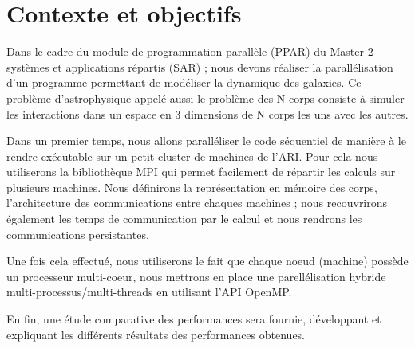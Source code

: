 \section{Contexte et objectifs}
\par Dans le cadre du module de programmation parallèle (PPAR)
du Master 2 systèmes et applications répartis (SAR) ; nous devons réaliser
la parallélisation d'un programme permettant de modéliser la dynamique des galaxies.
Ce problème d'astrophysique appelé aussi le problème des N-corps consiste à 
simuler les interactions dans un espace en 3 dimensions de N corps les uns avec
les autres.\\
\par Dans un premier temps, nous allons paralléliser le code séquentiel de manière 
à le rendre exécutable sur un petit cluster de machines de l'ARI. Pour cela nous 
utiliserons la bibliothèque MPI qui permet facilement de répartir les calculs sur 
plusieurs machines. Nous définirons la représentation en mémoire des corps, l'architecture des
communications entre chaques machines ; nous recouvrirons également les temps de 
communication par le calcul et nous rendrons les communications persistantes.\\
\par Une fois cela effectué, nous utiliserons le fait que chaque noeud (machine)
possède un processeur multi-coeur, nous mettrons en place une parellélisation hybride
multi-processus/multi-threads en utilisant l'API OpenMP.\\
\par En fin, une étude comparative des performances sera fournie,
développant et expliquant les différents résultats des performances obtenues.\\
